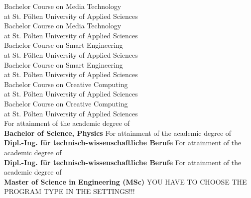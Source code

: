 \begin{center}
\vspace{1.3cm}
\ifUseBachelorMediaTechnologiesOne
	\fontsize{11pt}{15pt}\selectfont Bachelor Course on Media Technology\\
at St. Pölten University of Applied Sciences\\  
\else
	\ifUseBachelorMediaTechnologiesTwo
		\fontsize{11pt}{15pt}\selectfont Bachelor Course on Media Technology\\
at St. Pölten University of Applied Sciences\\  
\else
\ifUseBachelorSmartEngineeringOne
	\fontsize{11pt}{15pt}\selectfont Bachelor Course on Smart Engineering\\
at St. Pölten University of Applied Sciences\\  
\else
	\ifUseBachelorSmartEngineeringTwo
		\fontsize{11pt}{15pt}\selectfont Bachelor Course on Smart Engineering\\
at St. Pölten University of Applied Sciences\\  
\else
\ifUseBachelorCreativeComputingOne
	\fontsize{11pt}{15pt}\selectfont Bachelor Course on Creative Computing\\
at St. Pölten University of Applied Sciences\\  
\else
	\ifUseBachelorCreativeComputingTwo
		\fontsize{11pt}{15pt}\selectfont Bachelor Course on Creative Computing\\
at St. Pölten University of Applied Sciences\\  
\else
	\ifUseMasterInteractiveTechnologies
		\fontsize{11pt}{15pt}\selectfont For attainment of the academic degree of\\
		\textbf{Bachelor of Science, Physics}
\else
    \ifUseMasterDigitalDesign
		\fontsize{11pt}{15pt}\selectfont For attainment of the academic degree of\\
		\textbf{Dipl.-Ing. für technisch-wissenschaftliche Berufe}
\else
    \ifUseMasterDigitalMediaProduction
		\fontsize{11pt}{15pt}\selectfont For attainment of the academic degree of\\
		\textbf{Dipl.-Ing. für technisch-wissenschaftliche Berufe}
\else
	\ifUseMasterDigitalHealthCare
    	\fontsize{11pt}{15pt}\selectfont For attainment of the academic degree of\\
		\textbf{Master of Science in Engineering (MSc)}
    \else
        \LARGE{YOU HAVE TO CHOOSE THE PROGRAM TYPE IN THE SETTINGS!!!}
  	\fi
\fi
\fi
\fi\fi\fi
\fi\fi\fi\fi

\vspace{4mm}
 

\end{center}
